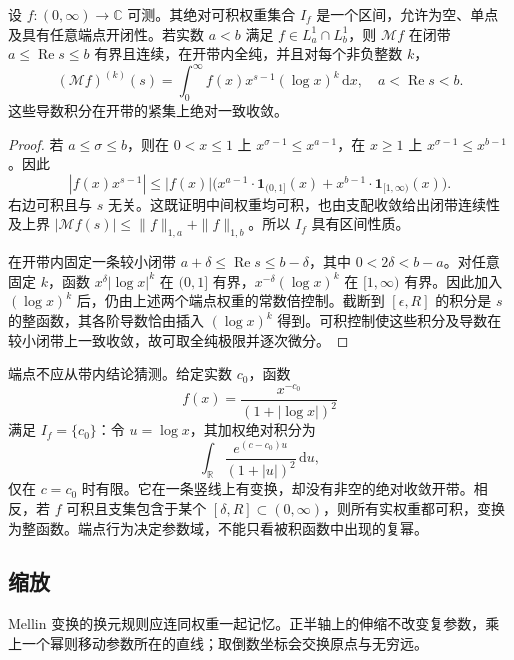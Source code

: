\begin{proposition}[收敛区间与带内全纯性]\label{b3:prop:21-mellin-strip}
设 \(f:(0,\infty)\to\mathbb C\) 可测。其绝对可积权重集合 \(I_f\) 是一个区间，允许为空、单点及具有任意端点开闭性。若实数 \(a<b\) 满足 \(f\in L^1_a\cap L^1_b\)，则 \(\mathcal Mf\) 在闭带 \(a\le\operatorname{Re}s\le b\) 有界且连续，在开带内全纯，并且对每个非负整数 \(k\)，
\[
 (\mathcal Mf)^{(k)}(s)
 =\int_0^\infty f(x)x^{s-1}(\log x)^k\,\mathrm dx,
 \quad a<\operatorname{Re}s<b.
\]
这些导数积分在开带的紧集上绝对一致收敛。
\end{proposition}
\begin{proof}
若 \(a\le\sigma\le b\)，则在 \(0<x\le1\) 上 \(x^{\sigma-1}\le x^{a-1}\)，在 \(x\ge1\) 上 \(x^{\sigma-1}\le x^{b-1}\)。因此
\[
 |f(x)x^{s-1}|
 \le |f(x)|\bigl(x^{a-1}\cdot\mathbf1_{(0,1]}(x)
                  +x^{b-1}\cdot\mathbf1_{[1,\infty)}(x)\bigr).
\]
右边可积且与 \(s\) 无关。这既证明中间权重均可积，也由支配收敛给出闭带连续性及上界 \(|\mathcal Mf(s)|\le\|f\|_{1,a}+\|f\|_{1,b}\)。所以 \(I_f\) 具有区间性质。

在开带内固定一条较小闭带 \(a+\delta\le\operatorname{Re}s\le b-\delta\)，其中 \(0<2\delta<b-a\)。对任意固定 \(k\)，函数 \(x^\delta|\log x|^k\) 在 \((0,1]\) 有界，\(x^{-\delta}(\log x)^k\) 在 \([1,\infty)\) 有界。因此加入 \((\log x)^k\) 后，仍由上述两个端点权重的常数倍控制。截断到 \([\epsilon,R]\) 的积分是 \(s\) 的整函数，其各阶导数恰由插入 \((\log x)^k\) 得到。可积控制使这些积分及导数在较小闭带上一致收敛，故可取全纯极限并逐次微分。
\end{proof}

端点不应从带内结论猜测。给定实数 \(c_0\)，函数
\[
 f(x)=\frac{x^{-c_0}}{(1+|\log x|)^2}
\]
满足 \(I_f=\{c_0\}\)：令 \(u=\log x\)，其加权绝对积分为
\[
 \int_{\mathbb R}\frac{e^{(c-c_0)u}}{(1+|u|)^2}\,\mathrm du,
\]
仅在 \(c=c_0\) 时有限。它在一条竖线上有变换，却没有非空的绝对收敛开带。相反，若 \(f\) 可积且支集包含于某个 \([\delta,R]\subset(0,\infty)\)，则所有实权重都可积，变换为整函数。端点行为决定参数域，不能只看被积函数中出现的复幂。

\subsection{缩放}
\label{b3:subsec:210502}

Mellin 变换的换元规则应连同权重一起记忆。正半轴上的伸缩不改变复参数，乘上一个幂则移动参数所在的直线；取倒数坐标会交换原点与无穷远。

